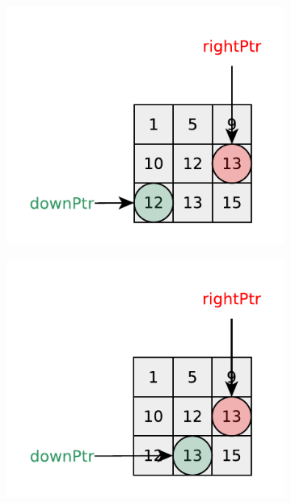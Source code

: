 \begin{figure}
\begin{subfigure}[t]{0.32\textwidth}
        \caption{}
        \label{fig:kth_smallest_in_sorted_matrix:visit4}
    \end{subfigure}
    \hfill
    \begin{subfigure}[t]{0.32\textwidth}
        \includegraphics[width=1\linewidth]{sources/kth_smallest_in_sorted_matrix/images/visit5}
        \caption{}
        \label{fig:kth_smallest_in_sorted_matrix:visit5}
    \end{subfigure}
    \hfill
    \begin{subfigure}[t]{0.32\textwidth}
        \includegraphics[width=1\linewidth]{sources/kth_smallest_in_sorted_matrix/images/visit6}

\end{subfigure}
\end{figure}
